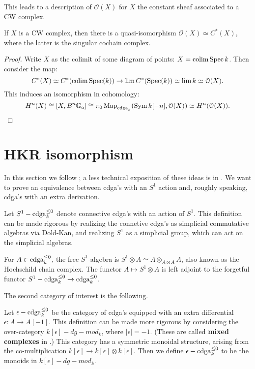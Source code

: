 This leads to a description of $\mathcal{O}(X)$ for $X$ the constant sheaf associated to a CW complex.

\begin{thm}
\label{thm:global_cochain}
If $X$ is a CW complex, then there is a quasi-isomorphism $\mathcal{O}(X) \simeq C^*(X)$, where the latter is the singular
cochain complex.
\end{thm}
\begin{proof}
Write $X$ as the colimit of some diagram of points: $X = \operatorname*{colim} \operatorname{Spec} k$. Then consider the map:
\[	C^*(X) \simeq C^*(\operatorname*{colim} \operatorname{Spec}(k)) \to \lim C^*(\operatorname{Spec}(k)) \simeq \lim k \simeq \mathcal{O}(X) .	\]
This induces an isomorphism in cohomology:
\[	H^n(X) \cong [X,B^n\mathbb G_a] \cong \pi_0 \operatorname{Map}_{\operatorname{cdga}_k}(\operatorname{Sym} k[-n], \mathcal{O}(X) ) \simeq H^n(\mathcal{O}(X)).	\]
\end{proof}



\section{HKR isomorphism}
In this section we follow \cite{TV_HKR}; a less technical exposition of these ideas is in \cite{BZN_loop}. We want
to prove an equivalence between cdga's with an $S^1$ action and, roughly speaking, cdga's with an extra derivation.

\begin{defin}
Let $S^1-\operatorname{cdga}_k^{\leq 0}$ denote connective cdga's with an action of $S^1$. This definition can be made rigorous by realizing
the connetive cdga's as simplicial commutative algebras via Dold-Kan, and realizing $S^1$ as a simplicial group, which can
act on the simplicial algebras.
\end{defin}

\begin{eg}
For $A \in \operatorname{cdga}_k^{\leq 0}$, the free $S^1$-algebra is $S^1 \otimes A \simeq A \otimes_{A\otimes A} A$, also known as the
Hochschild chain complex. The functor $A \mapsto S^1 \otimes A$ is left adjoint to the forgetful functor $S^1-\operatorname{cdga}_k^{\leq 0}
\to \operatorname{cdga}_k^{\leq 0}$.
\end{eg}

The second category of interest is the following.

\begin{defin}
Let $\epsilon-\operatorname{cdga}_k^{\leq 0}$ be the category of cdga's equipped with an extra differential $\epsilon : A \to A[-1]$. This
definition can be made more rigorous by considering the over-category $k[\epsilon] - dg-mod_k$, where $|\epsilon| = -1$. (These
are called \textbf{mixed complexes} in \cite{PTVV}.)
This category has a symmetric monoidal structure, arising from the co-multiplication $k[\epsilon] \to k[\epsilon]
\otimes k[\epsilon]$. Then we define $\epsilon-\operatorname{cdga}_k^{\leq 0}$ to be the monoids in $k[\epsilon] - dg-mod_k$.
\end{defin}

